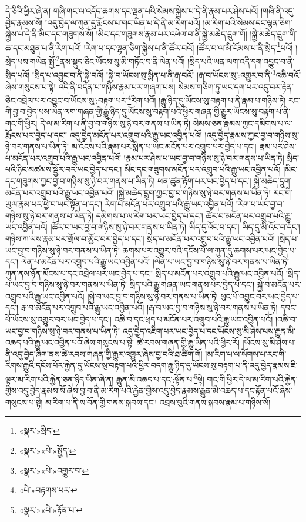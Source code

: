 དེ་ཅིའི་ཕྱིར་ཞེ་ན། གཞི་གང་ལ་འདོད་ཆགས་དང་ལྡན་པའི་སེམས་སྐྱེས་པ་དེ་ནི་རྣམ་པར་ཤེས་པའོ། །གཞི་ནི་འདུ་བྱེད་རྣམས་སོ། །འདུ་བྱེད་ལ་ཀུན་དུ་རྨོངས་པ་གང་ཡིན་པ་དེ་ནི་མ་རིག་པའོ། །མ་རིག་པའི་སེམས་དང་ལྷན་ཅིག་སྐྱེས་པ་དེ་ནི་མིང་དང་གཟུགས་སོ། །མིང་དང་གཟུགས་རྣམ་པར་འཕེལ་བ་ནི་སྐྱེ་མཆེད་དྲུག་གོ། །སྐྱེ་མཆེད་དྲུག་གི་ཆ་དང་མཐུན་པ་ནི་རེག་པའོ། །རེག་པ་དང་ལྷན་ཅིག་སྐྱེས་པ་ནི་ཚོར་བའོ། །ཚོར་བ་ལ་མི་ངོམས་པ་ནི་སྲེད་\footnote{«སྣར་»སྲིད་}པའོ། །སྲེད་པས་གཡེན་སྤྱོ་\footnote{«སྣར་»«པེ་»སྤྱོད་}ནས་སྡུད་ཅིང་ཡོངས་སུ་མི་གཏོང་བ་ནི་ལེན་པའོ། །སྲིད་པའི་ཡན་ལག་འདི་དག་འབྱུང་བ་ནི་སྲིད་པའོ། །སྲིད་པ་འབྱུང་བ་ནི་སྐྱེ་བའོ། །སྐྱེ་བ་ཡོངས་སུ་སྨིན་པ་ནི་རྒ་བའོ། །རྒ་བ་ཡོངས་སུ་:འགྱུར་བ་ནི་\footnote{«སྣར་»«པེ་»འགྱུར་བ་}འཆི་བའོ་ཞེས་གསུངས་པ་སྟེ། འདི་ནི་བདེན་པ་གཉིས་རྣམ་པར་གཞག་པས། སེམས་གཅིག་ཏུ་ཡང་དག་པར་འདུ་བར་རྟེན་ཅིང་འབྲེལ་པར་འབྱུང་བ་ཡོངས་སུ་:བརྟག་པར་\footnote{«པེ་»བརྟགས་པར་}རིག་པའོ། །རྒྱུ་ཉིད་དུ་ཡོངས་སུ་བརྟག་པ་ནི་རྣམ་པ་གཉིས་ཏེ། རང་གི་བྱ་བ་བྱེད་པས་ཡན་ལག་གཞན་གྱི་རྒྱུ་ཉིད་དུ་ཡོངས་སུ་བརྟག་པའི་ཕྱིར་གཞན་གྱི་རྒྱུར་ཡོངས་སུ་བརྟག་པ་ནི་གང་གི་ཕྱིར། དེ་ལ་མ་རིག་པ་ནི་བྱ་བ་གཉིས་སུ་ཉེ་བར་གནས་པ་ཡིན་ཏེ། སེམས་ཅན་རྣམས་ཀྱང་དམིགས་པ་ལ་རྨོངས་པར་བྱེད་པ་དང་། འདུ་བྱེད་མངོན་པར་འགྲུབ་པའི་རྒྱུ་ཡང་འབྱིན་པའོ། །འདུ་བྱེད་རྣམས་ཀྱང་བྱ་བ་གཉིས་སུ་ཉེ་བར་གནས་པ་ཡིན་ཏེ། མ་འོངས་པའི་རྣམ་པར་སྨིན་པ་ཡང་མངོན་པར་འགྲུབ་པར་བྱེད་པ་དང་། རྣམ་པར་ཤེས་པ་མངོན་པར་འགྲུབ་པའི་རྒྱུ་ཡང་འབྱིན་པའོ། །རྣམ་པར་ཤེས་པ་ཡང་བྱ་བ་གཉིས་སུ་ཉེ་བར་གནས་པ་ཡིན་ཏེ། སྲིད་པའི་ཉིང་མཚམས་སྦྱོར་བར་ཡང་བྱེད་པ་དང་། མིང་དང་གཟུགས་མངོན་པར་འགྲུབ་པའི་རྒྱུ་ཡང་འབྱིན་པའོ། །མིང་དང་གཟུགས་ཀྱང་བྱ་བ་གཉིས་སུ་ཉེ་བར་གནས་པ་ཡིན་ཏེ། ཕན་ཚུན་རྟོག་པར་ཡང་བྱེད་པ་དང་། སྐྱེ་མཆེད་དྲུག་མངོན་པར་འགྲུབ་པའི་རྒྱུ་ཡང་འབྱིན་པའོ། །སྐྱེ་མཆེད་དྲུག་ཀྱང་བྱ་བ་གཉིས་སུ་ཉེ་བར་གནས་པ་ཡིན་ཏེ། རང་གི་ཡུལ་རྣམ་པར་ཕྱེ་བ་ཡང་སྟོན་པ་དང་། རེག་པ་མངོན་པར་འགྲུབ་པའི་རྒྱུ་ཡང་འབྱིན་པའོ། །རེག་པ་ཡང་བྱ་བ་གཉིས་སུ་ཉེ་བར་གནས་པ་ཡིན་ཏེ། དམིགས་པ་ལ་རེག་པར་ཡང་བྱེད་པ་དང་། ཚོར་བ་མངོན་པར་འགྲུབ་པའི་རྒྱུ་ཡང་འབྱིན་པའོ། །ཚོར་བ་ཡང་བྱ་བ་གཉིས་སུ་ཉེ་བར་གནས་པ་ཡིན་ཏེ། ཡིད་དུ་འོང་བ་དང་། ཡིད་དུ་མི་འོང་བ་དང་། གཉིས་ཀ་ལས་རྣམ་པར་གྲོལ་བ་མྱོང་བར་བྱེད་པ་དང་། སྲེད་པ་མངོན་པར་འགྲུབ་པའི་རྒྱུ་ཡང་འབྱིན་པའོ། །སྲེད་པ་ཡང་བྱ་བ་གཉིས་སུ་ཉེ་བར་གནས་པ་ཡིན་ཏེ། ཆགས་པར་འགྱུར་བའི་དངོས་པོ་ལ་ཀུན་དུ་ཆགས་པར་ཡང་བྱེད་པ་དང་། ལེན་པ་མངོན་པར་འགྲུབ་པའི་རྒྱུ་ཡང་འབྱིན་པའོ། །ལེན་པ་ཡང་བྱ་བ་གཉིས་སུ་ཉེ་བར་གནས་པ་ཡིན་ཏེ། ཀུན་ནས་ཉོན་མོངས་པ་དང་འབྲེལ་པར་ཡང་བྱེད་པ་དང་། སྲིད་པ་མངོན་པར་འགྲུབ་པའི་རྒྱུ་ཡང་འབྱིན་པའོ། །སྲིད་པ་ཡང་བྱ་བ་གཉིས་སུ་ཉེ་བར་གནས་པ་ཡིན་ཏེ། སྲིད་པའི་རྒྱུ་གཞན་ཡང་གནས་པར་བྱེད་པ་དང་། སྐྱེ་བ་མངོན་པར་འགྲུབ་པའི་རྒྱུ་ཡང་འབྱིན་པའོ། །སྐྱེ་བ་ཡང་བྱ་བ་གཉིས་སུ་ཉེ་བར་གནས་པ་ཡིན་ཏེ། ཕུང་པོ་འབྱུང་བར་ཡང་བྱེད་པ་དང་། རྒ་བ་མངོན་པར་འགྲུབ་པའི་རྒྱུ་ཡང་འབྱིན་པའོ། །རྒ་བ་ཡང་བྱ་བ་གཉིས་སུ་ཉེ་བར་གནས་པ་ཡིན་ཏེ། དབང་པོ་ཡོངས་སུ་འགྱུར་བར་ཡང་བྱེད་པ་དང་། འཆི་བ་དང་ཕྲད་པ་མངོན་པར་འགྲུབ་པའི་རྒྱུ་ཡང་འབྱིན་པའོ། །འཆི་བ་ཡང་བྱ་བ་གཉིས་སུ་ཉེ་བར་གནས་པ་ཡིན་ཏེ། འདུ་བྱེད་འཇིག་པར་ཡང་བྱེད་པ་དང་ཡོངས་སུ་མི་ཤེས་པས་རྒྱུན་མི་འཆད་པའི་རྒྱུ་ཡང་འབྱིན་པའོ་ཞེས་གསུངས་པ་སྟེ། ཚེ་རབས་གཞན་གྱི་རྒྱུ་ཡིན་པའི་ཕྱིར་རོ། །ཡོངས་སུ་མི་ཤེས་པ་ནི་འདུ་བྱེད་ཞིག་ནས་ཚེ་རབས་གཞན་གྱི་རྒྱུར་འགྱུར་ཞེས་བྱ་བའི་ཐ་ཚིག་གོ། །མ་རིག་པ་ལ་སོགས་པ་རང་གི་རིགས་རྒྱུའི་དངོས་པོར་རྐྱེན་དུ་ཡོངས་སུ་བརྟག་པའི་ཕྱིར་བདག་རྒྱུ་ཉིད་དུ་ཡོངས་སུ་བརྟག་པ་ནི་འདུ་བྱེད་རྣམས་ཇི་ལྟར་མ་རིག་པའི་རྐྱེན་ཅན་ཉིད་ཡིན་ཞེ་ན། རྒྱུན་མི་འཆད་པ་དང་:སྟོན་པ་\footnote{«སྣར་»«པེ་»རྟོན་པ་}སྟེ། གང་གི་ཕྱིར་དེ་ལ་མ་རིག་པའི་རྐྱེན་གྱིས་འདུ་བྱེད་རྣམས་སོ་ཞེས་བྱ་བ་ནི་མ་རིག་པའི་རྐྱེན་གྱིས་འདུ་བྱེད་རྣམས་རྒྱུན་མི་འཆད་པ་དང་རྟོན་པའོ་ཞེས་གསུངས་པ་སྟེ། མ་རིག་པ་ནི་ས་བོན་གྱི་གནས་སྐབས་དང་། འབྲས་བུའི་གནས་སྐབས་རྣམ་པ་གཉིས་སོ། 